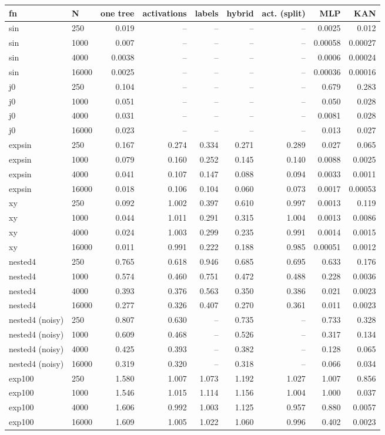 \begin{tabular}{@{}llrrrrrrr@{}}\toprule
fn & N & one tree & activations & labels & hybrid & act. (split) & MLP & KAN\\\midrule
sin & 250 & 0.019 & -- & -- & -- & -- & 0.0025 & 0.012\\
sin & 1000 & 0.007 & -- & -- & -- & -- & 0.00058 & 0.00027\\
sin & 4000 & 0.0038 & -- & -- & -- & -- & 0.0006 & 0.00024\\
sin & 16000 & 0.0025 & -- & -- & -- & -- & 0.00036 & 0.00016\\
j0 & 250 & 0.104 & -- & -- & -- & -- & 0.679 & 0.283\\
j0 & 1000 & 0.051 & -- & -- & -- & -- & 0.050 & 0.028\\
j0 & 4000 & 0.031 & -- & -- & -- & -- & 0.0081 & 0.028\\
j0 & 16000 & 0.023 & -- & -- & -- & -- & 0.013 & 0.027\\
expsin & 250 & 0.167 & 0.274 & 0.334 & 0.271 & 0.289 & 0.027 & 0.065\\
expsin & 1000 & 0.079 & 0.160 & 0.252 & 0.145 & 0.140 & 0.0088 & 0.0025\\
expsin & 4000 & 0.041 & 0.107 & 0.147 & 0.088 & 0.094 & 0.0033 & 0.0011\\
expsin & 16000 & 0.018 & 0.106 & 0.104 & 0.060 & 0.073 & 0.0017 & 0.00053\\
xy & 250 & 0.092 & 1.002 & 0.397 & 0.610 & 0.997 & 0.0013 & 0.119\\
xy & 1000 & 0.044 & 1.011 & 0.291 & 0.315 & 1.004 & 0.0013 & 0.0086\\
xy & 4000 & 0.024 & 1.003 & 0.299 & 0.235 & 0.991 & 0.0014 & 0.0015\\
xy & 16000 & 0.011 & 0.991 & 0.222 & 0.188 & 0.985 & 0.00051 & 0.0012\\
nested4 & 250 & 0.765 & 0.618 & 0.946 & 0.685 & 0.695 & 0.633 & 0.176\\
nested4 & 1000 & 0.574 & 0.460 & 0.751 & 0.472 & 0.488 & 0.228 & 0.0036\\
nested4 & 4000 & 0.393 & 0.376 & 0.563 & 0.350 & 0.386 & 0.021 & 0.0023\\
nested4 & 16000 & 0.277 & 0.326 & 0.407 & 0.270 & 0.361 & 0.011 & 0.0023\\
nested4 (noisy) & 250 & 0.807 & 0.630 & -- & 0.735 & -- & 0.733 & 0.328\\
nested4 (noisy) & 1000 & 0.609 & 0.468 & -- & 0.526 & -- & 0.317 & 0.134\\
nested4 (noisy) & 4000 & 0.425 & 0.393 & -- & 0.382 & -- & 0.128 & 0.065\\
nested4 (noisy) & 16000 & 0.319 & 0.320 & -- & 0.318 & -- & 0.066 & 0.034\\
exp100 & 250 & 1.580 & 1.007 & 1.073 & 1.192 & 1.027 & 1.007 & 0.856\\
exp100 & 1000 & 1.546 & 1.015 & 1.114 & 1.156 & 1.004 & 1.000 & 0.037\\
exp100 & 4000 & 1.606 & 0.992 & 1.003 & 1.125 & 0.957 & 0.880 & 0.0057\\
exp100 & 16000 & 1.609 & 1.005 & 1.022 & 1.060 & 0.996 & 0.402 & 0.0023\\
\bottomrule\end{tabular}